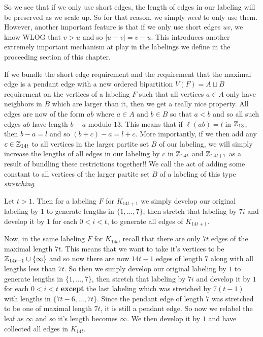   So we see that if we only use short edges, the length of edges in our labeling will be preserved as we scale up. So for that reason, we simply \textit{need} to only use them. However, another important feature is that if we only use short edges $uv$, we know WLOG that $v>u$ and so $|u-v|=v-u$. This introduces another extremely important mechanism at play in the labelings we define in the proceeding section of this chapter.

  If we bundle the short edge requirement and the requirement that the maximal edge is a pendant edge with a new ordered bipartition $V(F)=A\sqcup B$ requirement on the vertices of a labeling $F$ such that all vertices $a\in A$ only have neighbors in $B$ which are larger than it, then we get a really nice property. All edges are now of the form $ab$ where $a\in A$ and $b\in B$ so that $a<b$ and so all such edges $ab$ have length $b-a$ modulo $13$. This means that if $\ell(ab)=l$ in $\mathbb{Z}_{13}$, then $b-a=l$ and so $(b+c)-a=l+c$. More importantly, if we then add any $c\in \mathbb{Z}_{14t}$ to all vertices in the larger partite set $B$ of our labeling, we will simply increase the lengths of all edges in our labeling by $c$ in $\mathbb{Z}_{14t}$ and $\mathbb{Z}_{14t+1}$ as a result of bundling these restrictions together!! We call the act of adding some constant to all vertices of the larger partite set $B$ of a labeling of this type \textit{stretching}.

  Let $t>1$. Then for a labeling $F$ for $K_{14t+1}$ we simply develop our original labeling by $1$ to generate lengths in $\{1,\hdots,7\}$, then stretch that labeling by $7i$ and develop it by $1$ for each $0<i<t$, to generate all edges of $K_{14t+1}$. 
  
  Now, in the same labeling $F$ for $K_{14t}$, recall that there are only $7t$ edges of the maximal length $7t$. This means that we want to take it's vertices to be $\mathbb{Z}_{14t-1}\cup \{\infty\}$ and so now there are now $14t-1$ edges of length $7$ along with all lengths less than $7t$. So then we simply develop our original labeling by $1$ to generate lengths in $\{1,\hdots,7\}$, then stretch that labeling by $7i$ and develop it by $1$ for each $0<i<t$ \textbf{except} the last labeling which was stretched by $7(t-1)$ with lengths in $\{7t-6,\hdots,7t\}$. Since the pendant edge of length $7$ was stretched to be one of maximal length $7t$, it is still a pendant edge. So now we relabel the leaf as $\infty$ and so it's length becomes $\infty$. We then develop it by $1$ and have collected all edges in $K_{14t}$.

